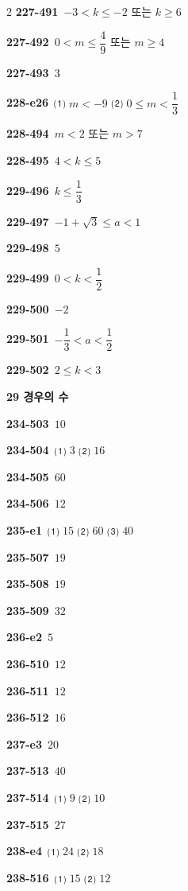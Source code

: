 \documentclass[10pt,a4paper]{article}
\begin{document}
\begin{multicols}{2}
\noindent\textbf{227-491}\ $-3<k\le -2$ 또는 $k\ge 6$\par
\noindent\textbf{227-492}\ $0<m\le \dfrac{4}{9}$ 또는 $m\ge 4$\par
\noindent\textbf{227-493}\ $3$\par
\noindent\textbf{228-e26}\ ⑴ $m<-9$ ⑵ $0\le m<\dfrac{1}{3}$\par
\noindent\textbf{228-494}\ $m<2$ 또는 $m>7$\par
\noindent\textbf{228-495}\ $4<k\le 5$\par
\noindent\textbf{229-496}\ $k\le \dfrac{1}{3}$\par
\noindent\textbf{229-497}\ $-1+\sqrt{3}\le a<1$\par
\noindent\textbf{229-498}\ $5$\par
\noindent\textbf{229-499}\ $0<k<\dfrac{1}{2}$\par
\noindent\textbf{229-500}\ $-2$\par
\noindent\textbf{229-501}\ $-\dfrac{1}{3}<a<\dfrac{1}{2}$\par
\noindent\textbf{229-502}\ $2\le k<3$\par
\noindent\textbf{29 경우의 수}\par\smallskip
\noindent\textbf{234-503}\ $10$\par
\noindent\textbf{234-504}\ ⑴ $3$ ⑵ $16$\par
\noindent\textbf{234-505}\ $60$\par
\noindent\textbf{234-506}\ $12$\par
\noindent\textbf{235-e1}\ ⑴ $15$ ⑵ $60$ ⑶ $40$\par
\noindent\textbf{235-507}\ $19$\par
\noindent\textbf{235-508}\ $19$\par
\noindent\textbf{235-509}\ $32$\par
\noindent\textbf{236-e2}\ $5$\par
\noindent\textbf{236-510}\ $12$\par
\noindent\textbf{236-511}\ $12$\par
\noindent\textbf{236-512}\ $16$\par
\noindent\textbf{237-e3}\ $20$\par
\noindent\textbf{237-513}\ $40$\par
\noindent\textbf{237-514}\ ⑴ $9$ ⑵ $10$\par
\noindent\textbf{237-515}\ $27$\par
\noindent\textbf{238-e4}\ ⑴ $24$ ⑵ $18$\par
\noindent\textbf{238-516}\ ⑴ $15$ ⑵ $12$\par

\end{multicols}
\end{document}
